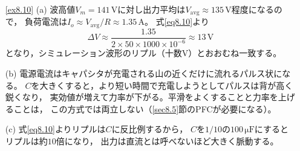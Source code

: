 \begin{enumerate}
(b) $P/\omega = 1000/314 \approx 3.2$\,J。これは出力$1$\,kWのわずか$3.2$\,ms分にすぎないが，
それでも$400$\,V系で$800\,\mathrm{\mu F}$という大きな容量になる。

(c) 式\ref{eq8.25}より$C$は$V$に反比例する。
電圧を高くとるほど同じエネルギーを小さな$C$で蓄えられる。
PFCの出力を$400$\,Vと高くする理由の1つである。

\item[\ref{ex8.10}]
(a) 波高値$V_m = 141$\,Vに対し出力平均は$V_{\mathrm{avg}} \approx 135$\,V程度になるので，
負荷電流は$I_o \approx V_{\mathrm{avg}}/R \approx 1.35$\,A。
式\ref{eq8.10}より
\begin{equation*}
\mathit{\Delta}V \approx \frac{1.35}{2\times50\times1000\times10^{-6}} \approx 13\,\mathrm{V}
\end{equation*}
となり，シミュレーション波形のリプル（十数V）とおおむね一致する。

(b) 電源電流はキャパシタが充電される山の近くだけに流れるパルス状になる。
$C$を大きくすると，より短い時間で充電しようとしてパルスは背が高く鋭くなり，
実効値が増えて力率が下がる。平滑をよくすることと力率を上げることは，
この方式では両立しない（\ref{sec8.5}節のPFCが必要になる）。

(c) 式\ref{eq8.10}よりリプルは$C$に反比例するから，
$C$を$1/10$の$100\,\mathrm{\mu F}$にするとリプルは約$10$倍になり，
出力は直流とは呼べないほど大きく脈動する。

\end{enumerate}
